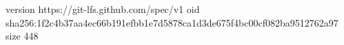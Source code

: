 version https://git-lfs.github.com/spec/v1
oid sha256:1f2c4b37aa4ec66b191efbb1e7d5878ca1d3de675f4bc00cf082ba9512762a97
size 448
